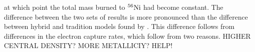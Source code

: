 \documentclass[iop,apj]{emulateapj}
\newcommand{\Ni}[1]{\ensuremath{{}^{#1}{\rm Ni}}}
\begin{document}
at which point the total mass burned to \Ni{56} had become constant.
The difference between the two sets of results is more pronounced
than the difference between hybrid and tradition models
found by \citet{willcoxetal2016}. This difference follows from
differences in the electron capture rates, which follow from
{\color{red} two} reasons. {\color{red} HIGHER CENTRAL DENSITY?
MORE METALLICIY? HELP!}
\end{document}
